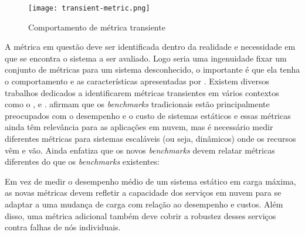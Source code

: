 \begin{figure}[!htb]
	\centering
	\texttt{[image: transient-metric.png]}
	\caption{Comportamento de métrica transiente}
	\label{fig:transient-metric}
\end{figure}


A métrica em questão deve ser identificada dentro da realidade e necessidade em que se encontra o sistema a ser avaliado. Logo seria uma ingenuidade fixar um conjunto de métricas para um sistema desconhecido, o importante é que ela tenha o comportamento e as características apresentadas por . Existem diversos trabalhos dedicados a  identificarem métricas transientes em vários contextos como o ,  e .
 afirmam que os \textit{benchmarks} tradicionais estão principalmente preocupados com o desempenho e o custo de sistemas estáticos e essas métricas ainda têm relevância para as aplicações em nuvem, mas é necessário medir diferentes métricas para sistemas escaláveis (ou seja, dinâmicos) onde os recursos vêm e vão. Ainda  enfatiza que os novos \textit{benchmarks} devem relatar métricas diferentes do que os \textit{benchmarks} existentes: 
\begin{citacao}
	Em vez de medir o desempenho médio de um sistema estático em carga máxima, as novas métricas devem refletir a capacidade dos serviços em nuvem para se adaptar a uma mudança de carga com relação ao desempenho e custos. Além disso, uma métrica adicional também deve cobrir a robustez desses serviços contra falhas de nós individuais.
\end{citacao}

